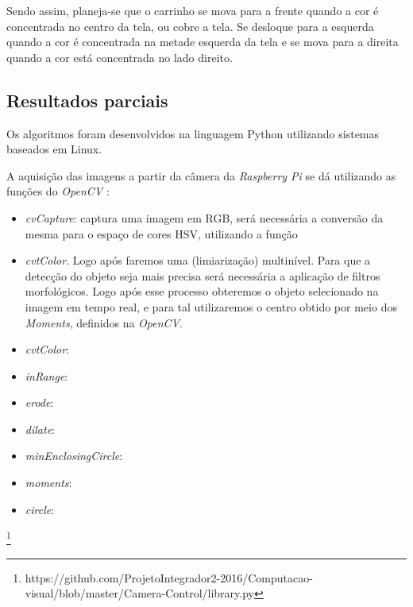 Sendo assim, planeja-se que o carrinho se mova para a frente quando a cor é concentrada no centro da tela, ou cobre a tela. Se desloque para a esquerda quando a cor é concentrada na metade esquerda da tela e se mova para a direita quando a cor está concentrada no lado direito. 

\subsection{Resultados parciais}

Os algoritmos foram desenvolvidos na linguagem Python utilizando sistemas baseados em Linux. 
	
A aquisição das imagens a partir da câmera da \textit{Raspberry Pi} se dá utilizando as funções do \textit{OpenCV} :

\begin{itemize} 
    \item \textit{cvCapture}: captura uma imagem em RGB, será necessária a conversão da mesma para o espaço de cores HSV, utilizando a função
    \item \textit{cvtColor}. Logo após faremos uma (limiarização) multinível. Para que a detecção do objeto seja mais precisa será necessária a aplicação de filtros morfológicos. Logo após esse processo obteremos o objeto selecionado na imagem em tempo real, e para tal utilizaremos o centro obtido por meio dos \textit{Moments}, definidos na \textit{OpenCV}.
    \item \textit{cvtColor}:
    \item \textit{inRange}:
    \item \textit{erode}:
    \item \textit{dilate}:
    \item \textit{minEnclosingCircle}:
    \item \textit{moments}:
    \item \textit{circle}:
\end{itemize}
 
\footnote{https://github.com/ProjetoIntegrador2-2016/Computacao-visual/blob/master/Camera-Control/library.py}
 






